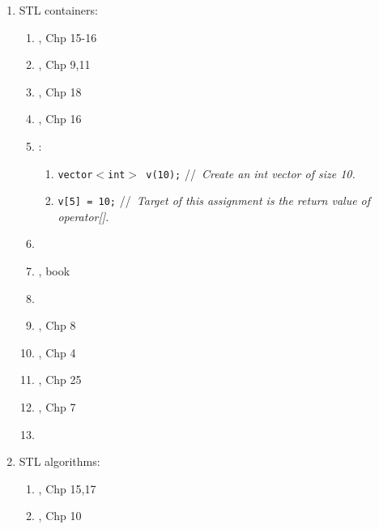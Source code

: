 \begin{enumerate}
\begin{enumerate}
	\item \cite{Reese2006a}
	\item \cite[Chp. 16, pp. 877--922, 930--940]{Prata2005}
	\item \cite[Chp. 21, 499--545]{Schildt2003a}
	\item \cite{Robson2000}
	\item \cite{Josuttis1999a}
	\end{enumerate}
\item STL containers: \vspace{-0.3cm}
	\begin{enumerate} \itemsep -2pt
	\item \cite{Gregoire2014}, Chp 15-16
	\item \cite{Lippman2013}, Chp 9,11
	\item \cite{Allain2012}, Chp 18
	\item \cite{Prata2012}, Chp 16
	\item \cite{EliteHussar2010}: \vspace{-0.2cm}
		\begin{enumerate} \itemsep -2pt
		\item {\tt vector$<$int$>$ v(10);} \hspace{0.2in} //{\it\ Create an int vector of size 10.}
		\item {\tt v[5] = 10;} //{\it\ Target of this assignment is the return value of operator[].}
		\end{enumerate}
	\item \cite[\S18.2, pp. 960--977]{Savitch2009}
	\item \cite{Reese2006a}, book
	\item \cite[Chp. 8]{Scheinerman2006}
	\item \cite{Schildt2004a}, Chp 8
	\item \cite{Eckel2003}, Chp 4
	\item \cite{Oualline2003}, Chp 25
	\item \cite{Vermeir2001}, Chp 7
	\item \cite[Chp. 24, pp. 625--691; Chp. 25--38, pp. 695--927]{Schildt1998a}
	\end{enumerate}
\item STL algorithms: \vspace{-0.3cm}
	\begin{enumerate} \itemsep -2pt
	\item \cite{Gregoire2014}, Chp 15,17
	\item \cite{Lippman2013}, Chp 10

\end{enumerate}
\end{enumerate}

